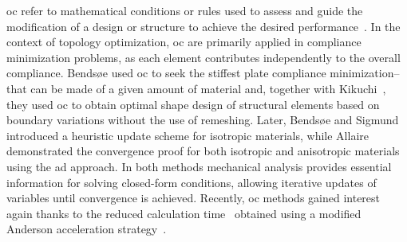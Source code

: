 \gls{oc} refer to mathematical conditions or rules used to assess and guide the modification of a design or structure to achieve the desired performance~. In the context of topology optimization, \gls{oc} are primarily applied in compliance minimization problems, as each element contributes independently to the overall compliance. Bendsøe used \gls{oc} to seek the stiffest plate \ie compliance minimization--that can be made of a given amount of material and, together with Kikuchi~, they used \gls{oc} to obtain optimal shape design of structural elements based on boundary variations without the use of remeshing. Later, Bendsøe and Sigmund~ introduced a heuristic update scheme for isotropic materials, while Allaire \etal~ demonstrated the convergence proof for both isotropic and anisotropic materials using the \gls{ad} approach. In both methods mechanical analysis provides essential information for solving closed-form conditions, allowing iterative updates of variables until convergence is achieved. Recently, \gls{oc} methods gained interest again thanks to the reduced calculation time~ obtained using a modified Anderson acceleration strategy~.

